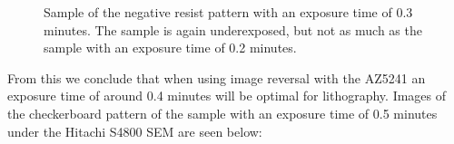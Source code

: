 \begin{figure}[H]
	\centering
	\caption{Sample of the negative resist pattern with an exposure time of 0.3 minutes. The sample is again underexposed, but not as much as the sample with an exposure time of 0.2 minutes.}
	\label{fig:b2i1}
\end{figure}

From this we conclude that when using image reversal with the AZ5241 an exposure time of around 0.4 minutes will be optimal for lithography. Images of the checkerboard pattern of the sample with an exposure time of 0.5 minutes under the Hitachi S4800 SEM are seen below:


